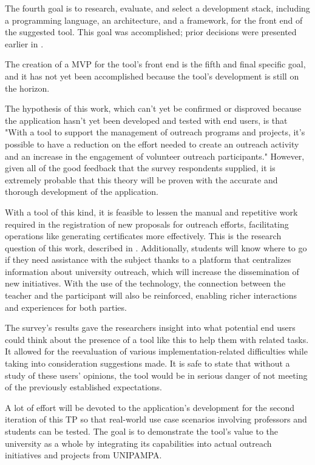 The fourth goal is to research, evaluate, and select a development stack, including a programming language, an architecture, and a framework, for the front end of the suggested tool. This goal was accomplished; prior decisions were presented earlier in .

The creation of a \ac{MVP} for the tool's front end is the fifth and final specific goal, and it has not yet been accomplished because the tool's development is still on the horizon.

The hypothesis of this work, which can't yet be confirmed or disproved because the application hasn't yet been developed and tested with end users, is that "With a tool to support the management of outreach programs and projects, it's possible to have a reduction on the effort needed to create an outreach activity and an increase in the engagement of volunteer outreach participants." However, given all of the good feedback that the survey respondents supplied, it is extremely probable that this theory will be proven with the accurate and thorough development of the application.

With a tool of this kind, it is feasible to lessen the manual and repetitive work required in the registration of new proposals for outreach efforts, facilitating operations like generating certificates more effectively. This is the research question of this work, described in . Additionally, students will know where to go if they need assistance with the subject thanks to a platform that centralizes information about university outreach, which will increase the dissemination of new initiatives. With the use of the technology, the connection between the teacher and the participant will also be reinforced, enabling richer interactions and experiences for both parties.

The survey's results gave the researchers insight into what potential end users could think about the presence of a tool like this to help them with related tasks. It allowed for the reevaluation of various implementation-related difficulties while taking into consideration suggestions made. It is safe to state that without a study of these users' opinions, the tool would be in serious danger of not meeting of the previously established expectations.

A lot of effort will be devoted to the application's development for the second iteration of this \ac{TP} so that real-world use case scenarios involving professors and students can be tested. The goal is to demonstrate the tool's value to the university as a whole by integrating its capabilities into actual outreach initiatives and projects from \ac{UNIPAMPA}.
